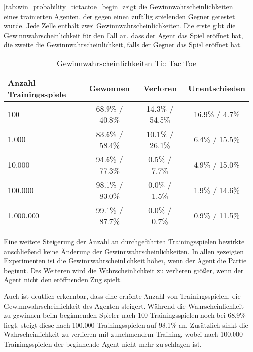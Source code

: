 \documentclass[11pt]{scrartcl}
\begin{document}
\autoref{tab:win_probability_tictactoe_begin} zeigt die Gewinnwahrscheinlichkeiten eines
trainierten Agenten, der gegen einen zufällig spielenden Gegner getestet wurde. Jede Zelle
enthält zwei Gewinnwahrscheinlichkeiten. Die erste gibt die Gewinnwahrscheinlichkeit für
den Fall an, dass der Agent das Spiel eröffnet hat, die zweite die
Gewinnwahrscheinlichkeit, falls der Gegner das Spiel eröffnet hat.
\begin{table}[ht]
  \begin{center}
    \begin{tabular}{l | c | c | c}
      Anzahl Trainingsspiele & Gewonnen & Verloren & Unentschieden \\
      \hline
      100 & 68.9\% / 40.8\% & 14.3\% / 54.5\% & 16.9\% / 4.7\% \\
      1.000 & 83.6\% / 58.4\% & 10.1\% / 26.1\% & 6.4\% / 15.5\% \\
      10.000 & 94.6\% / 77.3\% & 0.5\% / 7.7\% & 4.9\% / 15.0\% \\
      100.000 & 98.1\% / 83.0\% & 0.0\% / 1.5\% & 1.9\% / 14.6\% \\
      1.000.000 & 99.1\% / 87.7\% & 0.0\% / 0.7\% & 0.9\% / 11.5\% \\
    \end{tabular}

    \caption[Gewinnwahrscheinlichkeiten Tic-Tac-Toe]{Gewinnwahrscheinlichkeiten Tic Tac
    Toe}
    \label{tab:win_probability_tictactoe_begin}
  \end{center}
\end{table}

\noindent
Eine weitere Steigerung der Anzahl an durchgeführten Trainingsspielen bewirkte
anschließend keine Änderung der Gewinnwahrscheinlichkeiten. In allen gezeigten
Experimenten ist die Gewinnwahrscheinlichkeit höher, wenn der Agent die Partie beginnt.
Des Weiteren wird die Wahrscheinlichkeit zu verlieren größer, wenn der Agent nicht den
eröffnenden Zug spielt.

Auch ist deutlich erkennbar, dass eine erhöhte Anzahl von Trainingsspielen, die
Gewinnwahrscheinlichkeit des Agenten steigert. Während die Wahrscheinlichkeit zu gewinnen
beim beginnenden Spieler nach 100 Trainingsspielen noch bei 68.9\% liegt, steigt diese nach
100.000 Trainingsspielen auf 98.1\% an. Zusätzlich sinkt die Wahrscheinlichkeit zu verlieren mit
zunehmendem Training, wobei nach 100.000 Trainingsspielen der beginnende Agent nicht mehr zu
schlagen ist.
\end{document}
